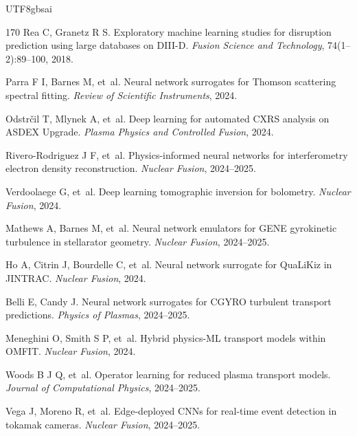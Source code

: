 \documentclass[12pt,a4paper]{article}
\begin{document}
\begin{CJK}{UTF8}{gbsai}
\begin{thebibliography}{170}
Rea C, Granetz R S.
\newblock Exploratory machine learning studies for disruption prediction using large databases on DIII-D.
\newblock \textit{Fusion Science and Technology}, 74(1--2):89--100, 2018.

Parra F I, Barnes M, et~al.
\newblock Neural network surrogates for Thomson scattering spectral fitting.
\newblock \textit{Review of Scientific Instruments}, 2024.

Odstr\v{c}il T, Mlynek A, et~al.
\newblock Deep learning for automated CXRS analysis on ASDEX Upgrade.
\newblock \textit{Plasma Physics and Controlled Fusion}, 2024.

Rivero-Rodriguez J F, et~al.
\newblock Physics-informed neural networks for interferometry electron density reconstruction.
\newblock \textit{Nuclear Fusion}, 2024--2025.

Verdoolaege G, et~al.
\newblock Deep learning tomographic inversion for bolometry.
\newblock \textit{Nuclear Fusion}, 2024.

Mathews A, Barnes M, et~al.
\newblock Neural network emulators for GENE gyrokinetic turbulence in stellarator geometry.
\newblock \textit{Nuclear Fusion}, 2024--2025.

Ho A, Citrin J, Bourdelle C, et~al.
\newblock Neural network surrogate for QuaLiKiz in JINTRAC.
\newblock \textit{Nuclear Fusion}, 2024.

Belli E, Candy J.
\newblock Neural network surrogates for CGYRO turbulent transport predictions.
\newblock \textit{Physics of Plasmas}, 2024--2025.

Meneghini O, Smith S P, et~al.
\newblock Hybrid physics-ML transport models within OMFIT.
\newblock \textit{Nuclear Fusion}, 2024.

Woods B J Q, et~al.
\newblock Operator learning for reduced plasma transport models.
\newblock \textit{Journal of Computational Physics}, 2024--2025.

Vega J, Moreno R, et~al.
\newblock Edge-deployed CNNs for real-time event detection in tokamak cameras.
\newblock \textit{Nuclear Fusion}, 2024--2025.


\end{thebibliography}
\end{CJK}
\end{document}
